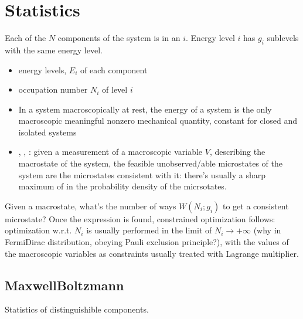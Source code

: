 \documentclass[letterpaper,10pt,english]{jupyterBook}
\begin{document}
\section{Statistics}
\label{\detokenize{ch/statistical-mechanics/notes:statistics}}\label{\detokenize{ch/statistical-mechanics/notes:statistical-mechanics-notes-distributions}}
\sphinxAtStartPar
Each of the \(N\) components of the system is in an  \(i\). Energy level \(i\) has \(g_i\) sublevels with the same energy level.
\begin{itemize}
\item {} 
\sphinxAtStartPar
energy levels, \(E_i\) of each component

\item {} 
\sphinxAtStartPar
occupation number \(N_i\) of level \(i\)

\item {} 
\sphinxAtStartPar
{} In a system macroscopically at rest, the energy of a system is the only macroscopic meaningful non\sphinxhyphen{}zero mechanical quantity, constant for closed and isolated systems

\item {} 
\sphinxAtStartPar
{}, , : given a measurement of a macroscopic variable \(V\), describing the macrostate of the system, the feasible un\sphinxhyphen{}observed/able microstates of the system are the microstates consistent with it: there’s usually a sharp maximum of in the probability density of the micrsotates.

\end{itemize}

\sphinxAtStartPar
Given a macrostate, what’s the number of ways \(W(N_i; g_i)\) to get a consistent microstate? Once the expression is found, constrained optimization follows: optimization w.r.t. \(N_i\) is usually performed in the limit of \(N_i \rightarrow +\infty\) (why in Fermi\sphinxhyphen{}Dirac distribution, obeying Pauli exclusion principle?), with the values of the macroscopic variables as constraints usually treated with Lagrange multiplier.


\subsection{Maxwell\sphinxhyphen{}Boltzmann}
\label{\detokenize{ch/statistical-mechanics/notes:maxwell-boltzmann}}\label{\detokenize{ch/statistical-mechanics/notes:statistical-mechanics-notes-distributions-mb}}
\sphinxAtStartPar
Statistics of distinguishible components.
\end{document}
